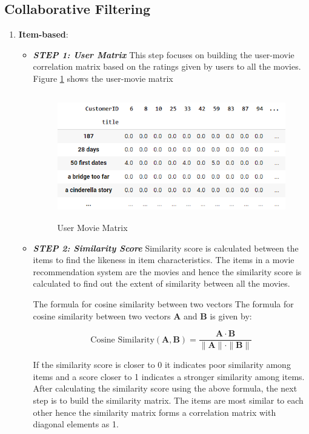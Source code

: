 \documentclass[a4paper,10pt]{article}
\begin{document}
\subsection{Collaborative Filtering}

\begin{enumerate}
    \item \textbf{Item-based}: 
    \vspace{2}
    \begin{itemize}
        \item  \textbf{\textit{STEP 1: User Matrix}}
        \vspace{2}
        This step focuses on building the user-movie correlation matrix based on the ratings given by users to all the movies. Figure \ref{user_movie} shows the user-movie matrix 

\begin{figure}[H]
    
        \centering
        \includegraphics[height=5.5cm]{figures/user_movie.png}
        \caption{User Movie Matrix}
        \label{user_movie}
        
\end{figure}
 
    \item  \textbf{\textit{STEP 2: Similarity Score }} 
        Similarity score is calculated between the items to find the likeness in item characteristics. The items in a movie recommendation system are the movies and hence the similarity score is calculated to find out the extent of similarity between all the movies.

        The formula for cosine similarity between two vectors
The formula for cosine similarity between two vectors $\mathbf{A}$ and $\mathbf{B}$ is given by:

\[
\text{Cosine Similarity}(\mathbf{A}, \mathbf{B}) = \frac{\mathbf{A} \cdot \mathbf{B}}{\|\mathbf{A}\| \cdot \|\mathbf{B}\|}
\]


If the similarity score is closer to 0 it indicates poor similarity among items and a score closer to 1 indicates a stronger similarity among items. After calculating the similarity score using the above formula, the next step is to build the similarity matrix. 
The items are most similar to each other hence the similarity matrix forms a correlation matrix with diagonal elements as 1.


\end{itemize}
\end{enumerate}
\end{document}

